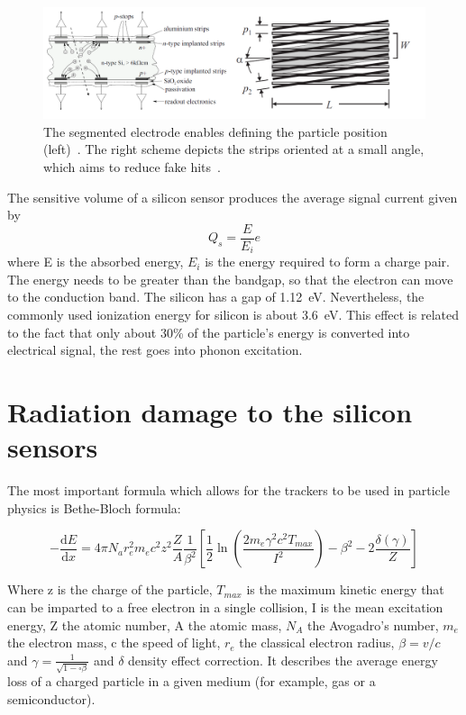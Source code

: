 \begin{figure}[!h]
\centering
\includegraphics[width=1\columnwidth]{Chapter2/images/silicons.png}
\caption{The segmented electrode enables defining the particle position (left)~\cite{Sokolov:2006vdx}. The right scheme depicts the strips oriented at a small angle, which aims to reduce fake hits~\cite{Spieler}.}
\label{fig_si}
\end{figure}
\newpage


The sensitive volume of a silicon sensor produces the average signal current given by 
\begin{equation}
    Q_{s} = \frac{E}{E_{i}}e
\end{equation}
where E is the absorbed energy, $E_{i}$ is the energy required to form a charge pair. The energy needs to be greater than the bandgap, so that the electron can move to the conduction band. The silicon has a gap of 1.12~eV. Nevertheless, the commonly used ionization energy for silicon is about 3.6~eV. This effect is related to the fact that only about 30\% of the particle's energy is converted into electrical signal, the rest goes into phonon excitation.



\section{Radiation damage to the silicon sensors} 

The most important formula which allows for the trackers to be used in particle physics is Bethe-Bloch formula:

\begin{equation}
-\dfrac{\mathrm dE}{\mathrm dx} = 4 \pi N_{a} r_{e}^{2} m_{e} c^{2} z^{2}  \dfrac{Z}{A} \frac{1}{\beta^{2}} \left[ \frac{1}{2}\ln(\frac{2m_{e}\gamma^{2}c^{2} T_{max}}{I^{2}}) - \beta^{2} -  2\frac{\delta(\gamma)}{Z}\right]
\end{equation}

Where z is the charge of the particle, $T_{max}$ is the maximum kinetic energy that can be imparted to a free electron in a single collision, I is the mean excitation energy, Z the atomic number, A the atomic mass, $N_{A}$ the Avogadro’s number, $m_{e}$ the electron mass, c the speed of light, $r_{e}$ the classical electron radius, $\beta = v/c$ and $\gamma = \frac{1}{\sqrt{1-\square\beta}}$ and $\delta$ density effect correction. It describes the average energy loss of a charged particle in a given medium (for example, gas or a semiconductor). 

